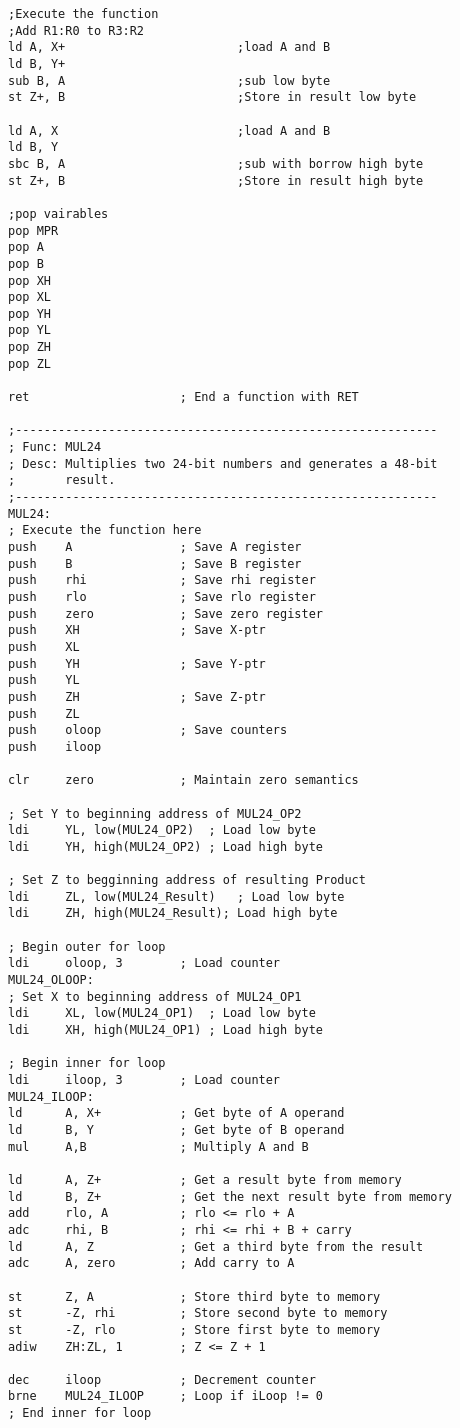 \documentclass[12pt,letterpaper]{article}
\begin{document}
\begin{verbatim}
;Execute the function
;Add R1:R0 to R3:R2
ld A, X+						;load A and B
ld B, Y+
sub B, A						;sub low byte
st Z+, B						;Store in result low byte

ld A, X							;load A and B
ld B, Y
sbc B, A 						;sub with borrow high byte
st Z+, B						;Store in result high byte

;pop vairables
pop MPR
pop A
pop B
pop XH
pop XL
pop YH
pop YL
pop ZH 
pop ZL 

ret						; End a function with RET

;-----------------------------------------------------------
; Func: MUL24
; Desc: Multiplies two 24-bit numbers and generates a 48-bit 
;		result.
;-----------------------------------------------------------
MUL24:
; Execute the function here
push 	A				; Save A register
push	B				; Save B register
push	rhi				; Save rhi register
push	rlo				; Save rlo register
push	zero			; Save zero register
push	XH				; Save X-ptr
push	XL
push	YH				; Save Y-ptr
push	YL				
push	ZH				; Save Z-ptr
push	ZL
push	oloop			; Save counters
push	iloop				

clr		zero			; Maintain zero semantics

; Set Y to beginning address of MUL24_OP2
ldi		YL, low(MUL24_OP2)	; Load low byte
ldi		YH, high(MUL24_OP2)	; Load high byte

; Set Z to begginning address of resulting Product
ldi		ZL, low(MUL24_Result)	; Load low byte
ldi		ZH, high(MUL24_Result); Load high byte

; Begin outer for loop
ldi		oloop, 3		; Load counter
MUL24_OLOOP:
; Set X to beginning address of MUL24_OP1
ldi		XL, low(MUL24_OP1)	; Load low byte
ldi		XH, high(MUL24_OP1)	; Load high byte

; Begin inner for loop
ldi		iloop, 3		; Load counter
MUL24_ILOOP:
ld		A, X+			; Get byte of A operand
ld		B, Y			; Get byte of B operand
mul		A,B				; Multiply A and B

ld		A, Z+			; Get a result byte from memory
ld		B, Z+			; Get the next result byte from memory
add		rlo, A			; rlo <= rlo + A
adc		rhi, B			; rhi <= rhi + B + carry
ld		A, Z			; Get a third byte from the result
adc		A, zero			; Add carry to A

st		Z, A			; Store third byte to memory
st		-Z, rhi			; Store second byte to memory
st		-Z, rlo			; Store first byte to memory
adiw	ZH:ZL, 1		; Z <= Z + 1	

dec		iloop			; Decrement counter
brne	MUL24_ILOOP		; Loop if iLoop != 0
; End inner for loop


\end{verbatim}
\end{document}
